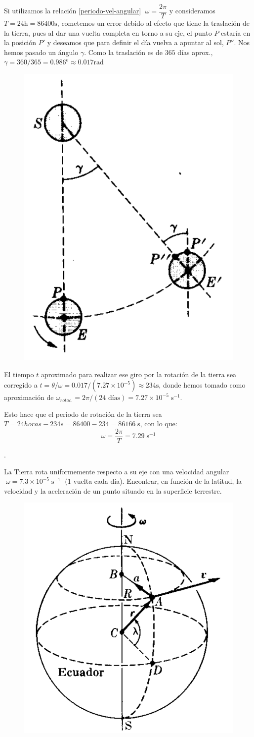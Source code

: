 \begin{multicols}{2}
Si utilizamos la relación \ref{periodo-vel-angular} $\;\omega=\dfrac {2\pi}T$ y consideramos $T=24\mathrm{h}=86400 \mathrm{s}$, cometemos un error debido al efecto que tiene la traslación de la tierra, pues al dar una vuelta completa en torno a su eje, el punto $P$ estaría en la posición $P'$ y deseamos que para definir el día vuelva a apuntar al sol, $P''$. Nos hemos pasado un ángulo $\gamma$. Como la traslación es de $365$ días aprox., $\gamma=360/365 =0.986^o\approx 0.017 \text{rad}$
\begin{figure}[H]
		\centering
		\includegraphics[width=.4\textwidth]{imagenes/imagenes02/T02IM18.png}
		\end{figure}
\end{multicols}

El tiempo $t$ aproximado para realizar ese giro por la rotación de la tierra sea corregido a  $t=\theta / \omega= 0.017 / (7.27\times 10^{-5}) \approx 234 \mathrm{s}$, donde hemos tomado como aproximación de $\omega_{rotac.}=2\pi / (24 \text{ días})=7.27\times 10^{-5}\; \mathrm{s}^{-1}$.

Esto hace que el periodo de rotación de la tierra sea $T=24horas - 234 s= 86400-234=86166\; \mathrm{s}$, con lo que:
$$\omega=\displaystyle \dfrac {2\pi}T=7.29\; \mathrm{s}^{-1}$$

\begin{prob}.

	\begin{multicols}{2}
La Tierra rota uniformemente respecto a su eje con una velocidad angular $\;\omega=7.3 \times 10^{-5}\;\mathrm{s}^{-1}\;$ (1 vuelta cada día). Encontrar, en función de la latitud, la velocidad y la aceleración de un punto situado en la superficie terrestre.
\begin{figure}[H]
		\centering
		\includegraphics[width=.35\textwidth]{imagenes/imagenes02/T02IM17.png}
		\end{figure}
\end{multicols}
\end{prob}

